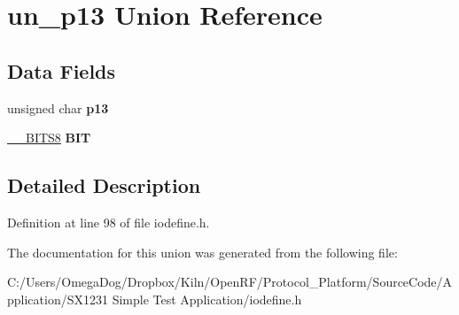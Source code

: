 \hypertarget{unionun__p13}{\section{un\-\_\-p13 Union Reference}
\label{unionun__p13}
}
\subsection*{Data Fields}
\begin{DoxyCompactItemize}
\item 
\hypertarget{unionun__p13_a1da1f1a95b7d27250c24bd1e5f69b4ec}{unsigned char {\bfseries p13}}\label{unionun__p13_a1da1f1a95b7d27250c24bd1e5f69b4ec}

\item 
\hypertarget{unionun__p13_a501ba18421e3d8c18747e004806faf3b}{\hyperlink{struct_____b_i_t_s8}{\-\_\-\-\_\-\-B\-I\-T\-S8} {\bfseries B\-I\-T}}\label{unionun__p13_a501ba18421e3d8c18747e004806faf3b}

\end{DoxyCompactItemize}


\subsection{Detailed Description}


Definition at line 98 of file iodefine.\-h.



The documentation for this union was generated from the following file\-:\begin{DoxyCompactItemize}
\item 
C\-:/\-Users/\-Omega\-Dog/\-Dropbox/\-Kiln/\-Open\-R\-F/\-Protocol\-\_\-\-Platform/\-Source\-Code/\-Application/\-S\-X1231 Simple Test Application/iodefine.\-h\end{DoxyCompactItemize}
